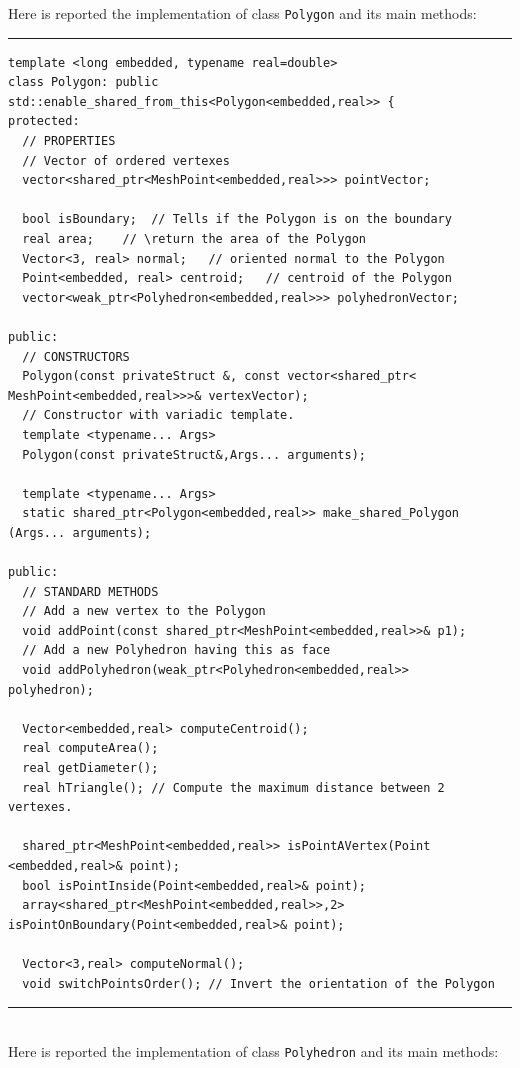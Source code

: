 Here is reported the implementation of class \verb|Polygon| and its main methods:\\

\noindent\rule{16cm}{1pt}
\begin{lstlisting}[caption=File \texttt{Polygon.h}]
template <long embedded, typename real=double>
class Polygon: public std::enable_shared_from_this<Polygon<embedded,real>> {
protected:
  // PROPERTIES
  // Vector of ordered vertexes
  vector<shared_ptr<MeshPoint<embedded,real>>> pointVector;
	
  bool isBoundary;	// Tells if the Polygon is on the boundary
  real area;	// \return the area of the Polygon
  Vector<3, real> normal;	// oriented normal to the Polygon
  Point<embedded, real> centroid;	// centroid of the Polygon
  vector<weak_ptr<Polyhedron<embedded,real>>> polyhedronVector;

public:
  // CONSTRUCTORS
  Polygon(const privateStruct &, const vector<shared_ptr<
MeshPoint<embedded,real>>>& vertexVector);
  // Constructor with variadic template.
  template <typename... Args>
  Polygon(const privateStruct&,Args... arguments);

  template <typename... Args>
  static shared_ptr<Polygon<embedded,real>> make_shared_Polygon
(Args... arguments);

public:
  // STANDARD METHODS
  // Add a new vertex to the Polygon
  void addPoint(const shared_ptr<MeshPoint<embedded,real>>& p1); 
  // Add a new Polyhedron having this as face
  void addPolyhedron(weak_ptr<Polyhedron<embedded,real>> 
polyhedron);	
			
  Vector<embedded,real> computeCentroid();
  real computeArea();
  real getDiameter();
  real hTriangle(); // Compute the maximum distance between 2 vertexes.

  shared_ptr<MeshPoint<embedded,real>> isPointAVertex(Point
<embedded,real>& point);	
  bool isPointInside(Point<embedded,real>& point);
  array<shared_ptr<MeshPoint<embedded,real>>,2> 
isPointOnBoundary(Point<embedded,real>& point);

  Vector<3,real> computeNormal();
  void switchPointsOrder(); // Invert the orientation of the Polygon
\end{lstlisting}

\noindent\rule{16cm}{1pt}\\

Here is reported the implementation of class \verb|Polyhedron| and its main methods:

